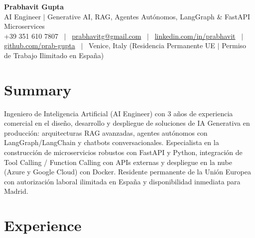 \documentclass[a4paper,10pt]{article}
\begin{document}
\begin{minipage}[c]{0.80\textwidth}
  {\Huge\bfseries Prabhavit Gupta}\\[3pt]
  {\color{accent}\large AI Engineer $\vert$ Generative AI, RAG, Agentes Autónomos, LangGraph \& FastAPI Microservices}\\[6pt]
  {\footnotesize +39 351 610 7807 ~$\vert$~
  \href{mailto:prabhavitg@gmail.com}{prabhavitg@gmail.com} ~$\vert$~
  \href{https://www.linkedin.com/in/prabhavit/}{linkedin.com/in/prabhavit} ~$\vert$~
  \href{https://github.com/prab-gupta}{github.com/prab-gupta} ~$\vert$~
  Venice, Italy (Residencia Permanente UE $\vert$ Permiso de Trabajo Ilimitado en España)}
\end{minipage}\hfill

\section{Summary}
Ingeniero de Inteligencia Artificial (AI Engineer) con 3 años de experiencia comercial en el diseño, desarrollo y despliegue de soluciones de IA Generativa en producción: arquitecturas RAG avanzadas, agentes autónomos con LangGraph/LangChain y chatbots conversacionales. Especialista en la construcción de microservicios robustos con FastAPI y Python, integración de Tool Calling / Function Calling con APIs externas y despliegue en la nube (Azure y Google Cloud) con Docker. Residente permanente de la Unión Europea con autorización laboral ilimitada en España y disponibilidad inmediata para Madrid.

\section{Experience}
\end{document}
